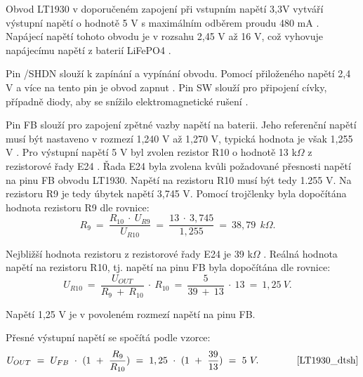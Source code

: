 Obvod LT1930 v doporučeném zapojení při vstupním napětí 3,3V vytváří výstupní napětí o hodnotě 5 V s maximálním odběrem proudu 480 mA \cite{LT1930_dtsh}. Napájecí napětí 
tohoto obvodu je v rozsahu 2,45 V až 16 V, což vyhovuje napájecímu napětí z baterií LiFePO4 \cite{LT1930_dtsh}.



Pin /SHDN slouží k zapínání a vypínání obvodu. Pomocí přiloženého napětí 2,4 V a více na tento pin je obvod zapnut \cite{LT1930_dtsh}. Pin SW slouží pro  připojení cívky, 
případně diody, aby se snížilo elektromagnetické rušení \cite{LT1930_dtsh}. 

Pin FB slouží  pro zapojení zpětné vazby napětí na baterii. Jeho referenční napětí musí být nastaveno v rozmezí 1,240 V až 1,270 V, typická hodnota je však 1,255 V \cite{LT1930_dtsh}. 
Pro výstupní napětí 5 V byl zvolen rezistor R10 o hodnotě 13 k$\Omega$ z rezistorové řady E24 \cite{rezistorova_rada}. Řada E24 byla zvolena kvůli požadované přesnosti
napětí na pinu FB obvodu LT1930. Napětí na rezistoru R10 musí být tedy 1.255 V. Na rezistoru R9 je tedy úbytek napětí 3,745 V. Pomocí trojčlenky byla dopočítána hodnota 
rezistoru R9 dle rovnice:
\begin{equation} 
  R_{9}~=~\frac{R_{10}~\cdot~U_{R9}}{U_{R10}}~=~\frac{13~\cdot~3,745}{1,255}~=~38,79~\:k\Omega. 
  \quad
\label{eq:R9}
\end{equation}

Nejbližší hodnota rezistoru z rezistorové řady E24 je 39 k$\Omega$ \cite{rezistorova_rada}. Reálná hodnota napětí na rezistoru R10, tj. napětí na pinu FB byla dopočítána
dle rovnice:
\begin{equation} 
  U_{R10}~=~\frac{U_{OUT}}{R_{9}~+~R_{10}}~\cdot~R_{10}~=~\frac{5}{39~+~13}~\cdot~13~=~1,25~V. 
  \quad
\label{eq:UR10}
\end{equation}

Napětí 1,25 V je v povoleném rozmezí napětí na pinu FB. 

Přesné výstupní napětí se spočítá podle vzorce:
\begin{equation} 
  U_{OUT}~=~U_{FB}~\cdot~(1~+~\frac{R_{9}}{R_{10}})~=~1,25~\cdot~(1~+~\frac{39}{13})~=~5~V. 
  \quad \quad \quad \quad \cite{LT1930_dtsh}
\label{eq:VOUT_LT1930}
\end{equation}


